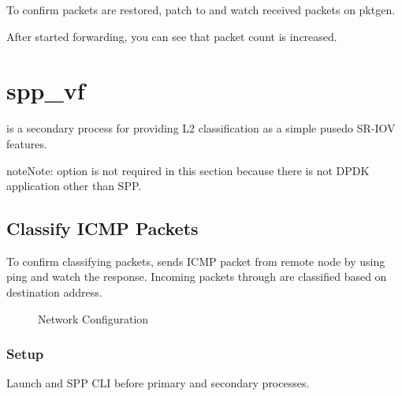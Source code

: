 \documentclass[a4paper,11pt,openany,oneside,english]{sphinxmanual}
\begin{document}
To confirm packets are restored, patch  to 
and watch received packets on pktgen.

\begin{sphinxVerbatim}[commandchars=\\\{\},formatcom=\footnotesize]
\end{sphinxVerbatim}

After started forwarding, you can see that packet count is increased.


\section{spp\_vf}
\label{\detokenize{usecases/spp_vf:spp-vf}}\label{\detokenize{usecases/spp_vf:spp-usecases-vf}}\label{\detokenize{usecases/spp_vf::doc}}
 is a secondary process for providing L2 classification as a simple
pusedo SR-IOV features.

\begin{sphinxadmonition}{note}{Note:}
 option is not required in this section because there is
not DPDK application other than SPP.
\end{sphinxadmonition}


\subsection{Classify ICMP Packets}
\label{\detokenize{usecases/spp_vf:classify-icmp-packets}}\label{\detokenize{usecases/spp_vf:spp-usecases-vf-cls-icmp}}
To confirm classifying packets, sends ICMP packet from remote node by using
ping and watch the response.
Incoming packets through  are classified based on destination address.

\begin{figure}[htbp]
\centering
\capstart

\noindent{}
\caption{Network Configuration}\label{\detokenize{usecases/spp_vf:id4}}\label{\detokenize{usecases/spp_vf:figure-spp-vf-use-cases-nw-config}}\end{figure}


\subsubsection{Setup}
\label{\detokenize{usecases/spp_vf:setup}}
Launch  and SPP CLI before primary and secondary processes.
\end{document}
